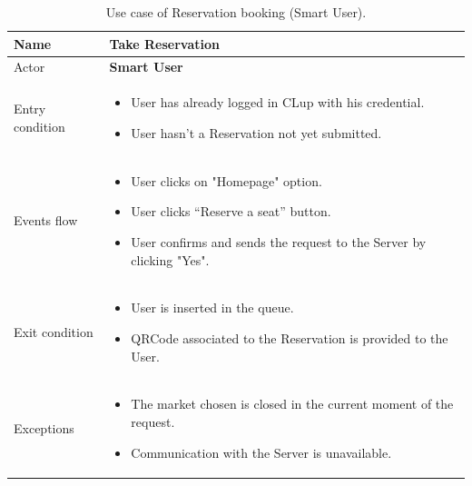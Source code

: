\begin{table}[H]\begin{tabular}{|p{5cm} | p{7cm} | }
	\hline
	Name & \textbf{Take Reservation} \\
	\hline
	Actor & \textbf{Smart User} \\
	\hline
	Entry condition &
	\begin{itemize}
		\item User has already logged in CLup with his credential. 
		\item User hasn't a Reservation not yet submitted. 
	\end{itemize} \\
	\hline
	Events flow & 
	\begin{itemize}
		\item User clicks on "Homepage" option.
		\item User clicks “Reserve a seat” button.
		\item User confirms and sends the request to the Server by clicking "Yes".
	\end{itemize} \\
	\hline
	Exit condition &
	\begin{itemize}	
		\item User is inserted in the queue.
		\item QRCode associated to the Reservation is provided to the User. 
	\end{itemize} \\
	\hline 
	Exceptions & \begin{itemize}
    \item The market chosen is closed in the current moment of the request.
    \item Communication with the Server is unavailable.
    \end{itemize}
 \\
	\hline
\end{tabular}
\caption{Use case of Reservation booking (Smart User).}
\end{table}

\pagebreak

